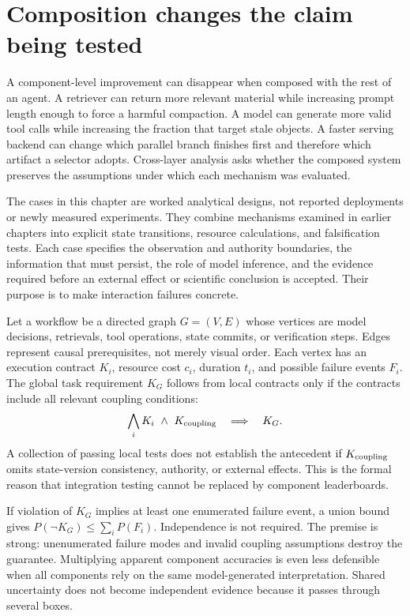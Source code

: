 \section{Composition changes the claim being tested}\label{sec:C33:01}
A component-level improvement can disappear when composed with the rest of an agent. A retriever can return more relevant material while increasing prompt length enough to force a harmful compaction. A model can generate more valid tool calls while increasing the fraction that target stale objects. A faster serving backend can change which parallel branch finishes first and therefore which artifact a selector adopts. Cross-layer analysis asks whether the composed system preserves the assumptions under which each mechanism was evaluated.

The cases in this chapter are worked analytical designs, not reported deployments or newly measured experiments. They combine mechanisms examined in earlier chapters into explicit state transitions, resource calculations, and falsification tests. Each case specifies the observation and authority boundaries, the information that must persist, the role of model inference, and the evidence required before an external effect or scientific conclusion is accepted. Their purpose is to make interaction failures concrete.

Let a workflow be a directed graph $G=(V,E)$ whose vertices are model decisions, retrievals, tool operations, state commits, or verification steps. Edges represent causal prerequisites, not merely visual order. Each vertex has an execution contract $K_i$, resource cost $c_i$, duration $t_i$, and possible failure events $F_i$. The global task requirement $K_G$ follows from local contracts only if the contracts include all relevant coupling conditions:
\begin{equation}
 \bigwedge_i K_i\ \land\ K_{\rm coupling}\quad\Longrightarrow\quad K_G.
\end{equation}
A collection of passing local tests does not establish the antecedent if $K_{\rm coupling}$ omits state-version consistency, authority, or external effects. This is the formal reason that integration testing cannot be replaced by component leaderboards.

If violation of $K_G$ implies at least one enumerated failure event, a union bound gives $P(\neg K_G)\leq\sum_iP(F_i)$. Independence is not required. The premise is strong: unenumerated failure modes and invalid coupling assumptions destroy the guarantee. Multiplying apparent component accuracies is even less defensible when all components rely on the same model-generated interpretation. Shared uncertainty does not become independent evidence because it passes through several boxes.

